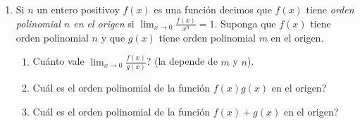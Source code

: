 \documentclass[12pt, a4paper]{article}
\begin{document}
\begin{enumerate}
\item Si $n$ un entero positivoy $f(x)$ es una función decimos que $f(x)$ tiene \emph{orden polinomial $n$ en el origen} si $\lim_{x\rightarrow 0} \frac{f(x)}{x^n}=1$. Suponga que $f(x)$ tiene orden polinomial $n$ y que $g(x)$ tiene orden polinomial $m$ en el origen.

\begin{enumerate}
\item Cuánto vale $\lim_{x\rightarrow 0} \frac{f(x)}{g(x)}$? (la depende de $m$ y $n$).
\item Cuál es el orden polinomial de la función $f(x)g(x)$ en el origen?
\item Cuál es el orden polinomial de la función $f(x)+g(x)$ en el origen?
\end{enumerate}


\end{enumerate}
\end{document}
